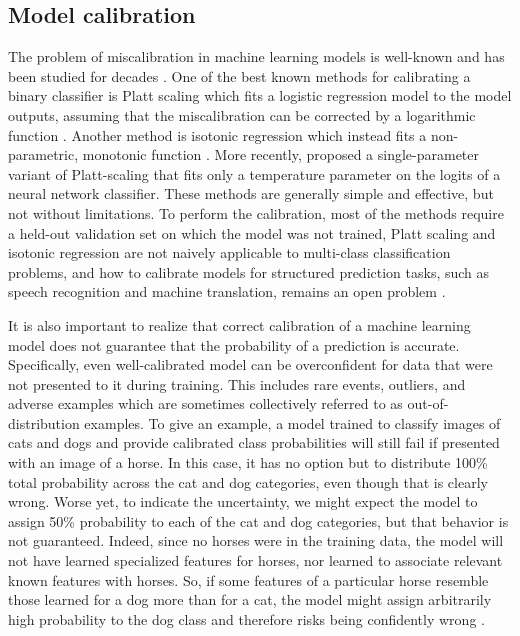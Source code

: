 \subsection{Model calibration}
% 
The problem of miscalibration in machine learning models is well-known and has been studied for decades \cite{lewis_sequential_1995, platt_probabilistic_1999, garczarek_classification_2002, zadrozny_transforming_2002, bennett_using_2003}. One of the best known methods for calibrating a binary classifier is Platt scaling which fits a logistic regression model to the model outputs, assuming that the miscalibration can be corrected by a logarithmic function \cite{platt_probabilistic_1999}. Another method is isotonic regression which instead fits a non-parametric, monotonic function \cite{zadrozny_transforming_2002}. 
More recently, \textcite{guo_calibration_2017} proposed a single-parameter variant of Platt-scaling that fits only a temperature parameter on the logits of a neural network classifier. 
These methods are generally simple and effective, but not without limitations. 
To perform the calibration, most of the methods require a held-out validation set on which the model was not trained, Platt scaling and isotonic regression are not naively applicable to multi-class classification problems, and how to calibrate models for structured prediction tasks, such as speech recognition and machine translation, remains an open problem \cite{astudillo_uncertainty_2010, astudillo_integration_2013, jayashankar_detecting_2020}.

It is also important to realize that correct calibration of a machine learning model does not guarantee that the probability of a prediction is accurate. 
Specifically, even well-calibrated model can be overconfident for data that were not presented to it during training. This includes rare events, outliers, and adverse examples which are sometimes collectively referred to as out-of-distribution examples. 
To give an example, a model trained to classify images of cats and dogs and provide calibrated class probabilities will still fail if presented with an image of a horse. In this case, it has no option but to distribute 100\% total probability across the cat and dog categories, even though that is clearly wrong. 
Worse yet, to indicate the uncertainty, we might expect the model to assign 50\% probability to each of the cat and dog categories, but that behavior is not guaranteed. Indeed, since no horses were in the training data, the model will not have learned specialized features for horses, nor learned to associate relevant known features with horses. So, if some features of a particular horse resemble those learned for a dog more than for a cat, the model might assign arbitrarily high probability to the dog class and therefore risks being confidently wrong \cite{zhou_survey_2022}. 



